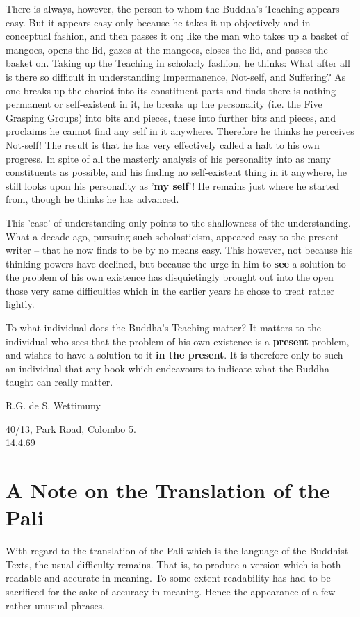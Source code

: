 There is always, however, the person to whom the Buddha’s Teaching
appears easy. But it appears easy only because he takes it up
objectively and in conceptual fashion, and then passes it on; like the
man who takes up a basket of mangoes, opens the lid, gazes at the
mangoes, closes the lid, and passes the basket on. Taking up the
Teaching in scholarly fashion, he thinks: What after all is there so
difficult in understanding Impermanence, Not-self, and Suffering? As one
breaks up the chariot into its constituent parts and finds there is
nothing permanent or self-existent in it, he breaks up the personality
(i.e. the Five Grasping Groups) into bits and pieces, these into further
bits and pieces, and proclaims he cannot find any self in it anywhere.
Therefore he thinks he perceives Not-self! The result is that he has
very effectively called a halt to his own progress. In spite of all the
masterly analysis of his personality into as many constituents as
possible, and his finding no self-existent thing in it anywhere, he
still looks upon his personality as '\textbf{my self}'! He remains just where
he started from, though he thinks he has advanced.


This 'ease' of understanding only points to the shallowness of the
understanding. What a decade ago, pursuing such scholasticism, appeared
easy to the present writer – that he now finds to be by no means easy.
This however, not because his thinking powers have declined, but because
the urge in him to \textbf{see} a solution to the problem of his own existence
has disquietingly brought out into the open those very same difficulties
which in the earlier years he chose to treat rather lightly.


To what individual does the Buddha’s Teaching matter? It matters to the
individual who sees that the problem of his own existence is a \textbf{present}
problem, and wishes to have a solution to it \textbf{in the present}. It is
therefore only to such an individual that any book which endeavours to
indicate what the Buddha taught can really matter.


R.G. de S. Wettimuny


40/13, Park Road, Colombo 5. \\
14.4.69


\hypertarget{x-a-note-on-the-translation-of-the-pali}{\section*{A Note on the Translation of the Pali}}
With regard to the translation of the Pali which is the language of the
Buddhist Texts, the usual difficulty remains. That is, to produce a
version which is both readable and accurate in meaning. To some extent
readability has had to be sacrificed for the sake of accuracy in
meaning. Hence the appearance of a few rather unusual phrases.


